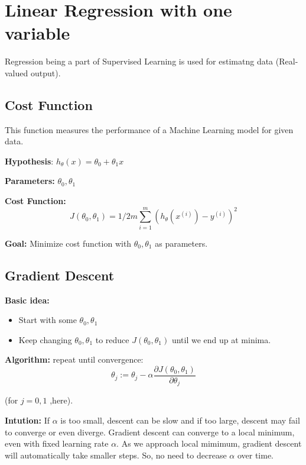 \section{Linear Regression with one variable}
  Regression being a part of Supervised Learning is used for estimatng data (Real-valued output).  

  \subsection{Cost Function}
    This function measures the performance of a Machine Learning model for given data.

    \textbf{Hypothesis}: $ h_ \theta(x) = \theta_0 + \theta_1x $

    \textbf{Parameters:} $ \theta_0, \theta_1 $

    \textbf{Cost Function:} 
    \begin{equation} \label {eq:1}
      J( \theta_0, \theta_1 ) = 1/2m \sum_{i=1}^{m} (h_\theta(x^{(i)})-y^{(i)})^2 
    \end{equation} 

    \textbf{Goal:} Minimize cost function with $ \theta_0, \theta_1 $ as parameters.

  \subsection{Gradient Descent}

    \textbf{Basic idea:}
    \begin{itemize}
    \item Start with some $ \theta_0, \theta_1 $
    \item Keep changing $ \theta_0, \theta_1 $ to reduce $ J(\theta_0, \theta_1) $ until we end up at minima.
    \end{itemize} 

    \textbf{Algorithm:}
     repeat until convergence:
    \begin{equation} \label {eq:2}
      \theta_j := \theta_j - \alpha \frac{\partial {J(\theta_0, \theta_1)}}{\partial \theta_j}
    \end{equation} 

    (for  $j = 0, 1 $  ,here).  

    \textbf{Intution:} 
    If $\alpha$ is too small, descent can be slow and if too large, descent may fail to converge or even diverge.
    Gradient descent can converge to a local minimum, even with fixed learning rate $\alpha$. As we approach local mimimum, gradient descent will automatically take smaller steps. So, no need to decrease $\alpha$ over time. 

